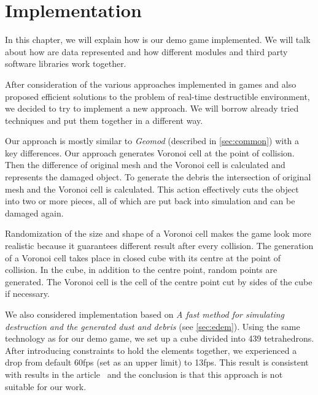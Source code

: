 \chapter{Implementation}
In this chapter, we will explain how is our demo game implemented. We will talk about how are data represented and how different modules and third party software libraries work together.

After consideration of the various approaches implemented in games and also proposed efficient solutions to the problem of real-time destructible environment, we decided to try to implement a new approach. We will borrow already tried techniques and put them together in a different way.

Our approach is mostly similar to \emph{Geomod} (described in \cref{sec:common}) with a key differences. Our approach generates Voronoi cell at the point of collision. Then the difference of original mesh and the Voronoi cell is calculated and represents the damaged object. To generate the debris the intersection of original mesh and the Voronoi cell is calculated. This action effectively cuts the object into two or more pieces, all of which are put back into simulation and can be damaged again.

Randomization of the size and shape of a Voronoi cell makes the game look more realistic because it guarantees different result after every collision. The generation of a Voronoi cell takes place in closed cube with its centre at the point of collision. In the cube, in addition to the centre point, random points are generated. The Voronoi cell is the cell of the centre point cut by sides of the cube if necessary.

We also considered implementation based on \emph{A fast method for simulating destruction and the generated dust and debris} (see \cref{sec:edem}). Using the same technology as for our demo game, we set up a cube divided into 439 tetrahedrons. After introducing constraints to hold the elements together, we experienced a drop from default 60fps (set as an upper limit) to 13fps. This result is consistent with results in the article~\cite{edem} and the conclusion is that this approach is not suitable for our work.


